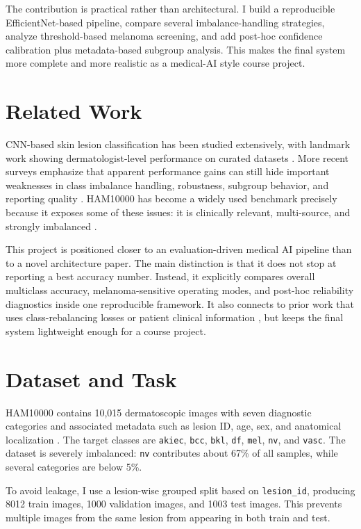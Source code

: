 \documentclass[conference]{IEEEtran}
\begin{document}
The contribution is practical rather than architectural. I build a reproducible EfficientNet-based pipeline, compare several imbalance-handling strategies, analyze threshold-based melanoma screening, and add post-hoc confidence calibration plus metadata-based subgroup analysis. This makes the final system more complete and more realistic as a medical-AI style course project.

\section{Related Work}
CNN-based skin lesion classification has been studied extensively, with landmark work showing dermatologist-level performance on curated datasets \cite{esteva2017dermatologist}. More recent surveys emphasize that apparent performance gains can still hide important weaknesses in class imbalance handling, robustness, subgroup behavior, and reporting quality \cite{khan2021survey,melo2025systematic}. HAM10000 has become a widely used benchmark precisely because it exposes some of these issues: it is clinically relevant, multi-source, and strongly imbalanced \cite{tschandl2018ham10000}.

This project is positioned closer to an evaluation-driven medical AI pipeline than to a novel architecture paper. The main distinction is that it does not stop at reporting a best accuracy number. Instead, it explicitly compares overall multiclass accuracy, melanoma-sensitive operating modes, and post-hoc reliability diagnostics inside one reproducible framework. It also connects to prior work that uses class-rebalancing losses \cite{cui2019classbalanced} or patient clinical information \cite{elngar2022clinicalinfo}, but keeps the final system lightweight enough for a course project.

\section{Dataset and Task}
HAM10000 contains 10{,}015 dermatoscopic images with seven diagnostic categories and associated metadata such as lesion ID, age, sex, and anatomical localization \cite{tschandl2018ham10000}. The target classes are \texttt{akiec}, \texttt{bcc}, \texttt{bkl}, \texttt{df}, \texttt{mel}, \texttt{nv}, and \texttt{vasc}. The dataset is severely imbalanced: \texttt{nv} contributes about 67\% of all samples, while several categories are below 5\%.

To avoid leakage, I use a lesion-wise grouped split based on \texttt{lesion\_id}, producing 8012 train images, 1000 validation images, and 1003 test images. This prevents multiple images from the same lesion from appearing in both train and test.
\end{document}
